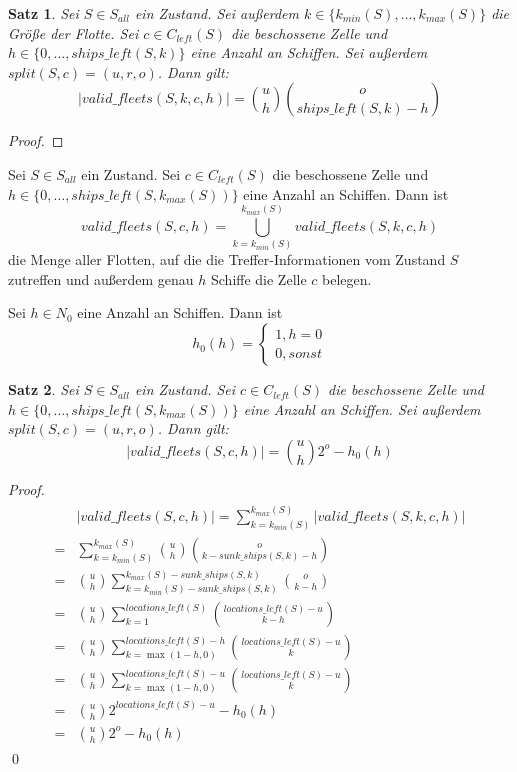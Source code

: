 \documentclass[a4paper,12pt]{llncs}
\numberwithin{equation}{section}
\newtheorem{satz}{Satz}
\begin{document}
\begin{satz}
Sei $S\in S_{all}$ ein Zustand.
Sei außerdem $k \in \{k_{min}(S), \dots, k_{max}(S)\}$ die Größe der Flotte.
Sei $c \in C_{left}(S)$ die beschossene Zelle und $h \in \{0, \dots, ships\_left(S, k)\}$ eine Anzahl an Schiffen.
Sei außerdem $split(S,c)=(u, r, o)$.
Dann gilt:
\[
|valid\_fleets(S,k,c,h)|=\binom{u}{h} \binom{o}{ships\_left(S, k) - h}
\]
\end{satz}

\begin{proof}
\end{proof}

\begin{definition}
Sei $S\in S_{all}$ ein Zustand.
Sei $c \in C_{left}(S)$ die beschossene Zelle und $h \in \{0, \dots, ships\_left(S, k_{max}(S))\}$ eine Anzahl an Schiffen.
Dann ist
\[
valid\_fleets(S,c,h)=\bigcup_{k=k_{min}(S)}^{k_{max}(S)} valid\_fleets(S,k,c,h)
\]
die Menge aller Flotten, auf die die Treffer-Informationen vom Zustand $S$ zutreffen und außerdem genau $h$ Schiffe die Zelle $c$ belegen.
\end{definition}

\begin{definition}
Sei $h \in N_0$ eine Anzahl an Schiffen.
Dann ist
\[
h_0(h)=
\begin{cases}
1, h=0 \\
0, sonst
\end{cases}
\]
\end{definition}

\begin{satz}
Sei $S\in S_{all}$ ein Zustand.
Sei $c \in C_{left}(S)$ die beschossene Zelle und $h \in \{0, \dots, ships\_left(S, k_{max}(S))\}$ eine Anzahl an Schiffen.
Sei außerdem $split(S,c)=(u, r, o)$.
Dann gilt:
\[
|valid\_fleets(S,c,h)|=\binom{u}{h} 2^o - h_0(h)
\]
\end{satz}

\begin{proof}
\begin{align}
\begin{split}
&|valid\_fleets(S,c,h)|=\sum_{k=k_{min}(S)}^{k_{max}(S)} |valid\_fleets(S,k,c,h)|\\
=&\sum_{k=k_{min}(S)}^{k_{max}(S)} \binom{u}{h} \binom{o}{k - sunk\_ships(S,k) - h} \\
=&\binom{u}{h} \sum_{k=k_{min}(S)-sunk\_ships(S, k)}^{k_{max}(S) - sunk\_ships(S, k)} \binom{o}{k - h} \\
=&\binom{u}{h} \sum_{k=1}^{locations\_left(S)} \binom{locations\_left(S) - u}{k - h} \\
=&\binom{u}{h} \sum_{k=\max(1 - h, 0)}^{locations\_left(S) - h} \binom{locations\_left(S) - u}{k} \\
=&\binom{u}{h} \sum_{k=\max(1 - h, 0)}^{locations\_left(S) - u} \binom{locations\_left(S) - u}{k} \\
=&\binom{u}{h} 2^{locations\_left(S) - u} - h_0(h)\\
=&\binom{u}{h} 2^{o} - h_0(h)
\end{split}
\end{align}
\qed
\end{proof}
\end{document}
